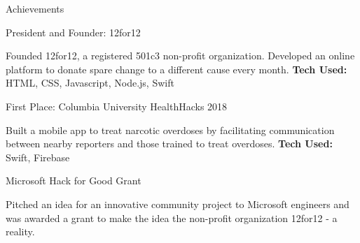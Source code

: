 \documentclass{resume}
\begin{document}
\begin{rSection}{Achievements} 

\begin{rSubsection}{President and Founder: 12for12}{}{}{}
\item Founded 12for12, a registered 501c3 non-profit organization. Developed an online platform to donate spare change to a different cause every month. {\bf Tech Used:} HTML, CSS, Javascript, Node.js, Swift
\end{rSubsection}
\begin{rSubsection}{First Place: Columbia University HealthHacks 2018}{}{}{}
\item Built a mobile app to treat narcotic overdoses by facilitating communication between nearby reporters and those trained to treat overdoses. {\bf Tech Used:} Swift, Firebase
\end{rSubsection}
\begin{rSubsection}{Microsoft Hack for Good Grant}{}{}{}
\item Pitched an idea for an innovative community project to Microsoft engineers and was awarded a grant to make the idea the non-profit organization 12for12 - a reality. 
\end{rSubsection}

\end{rSection}
\end{document}
